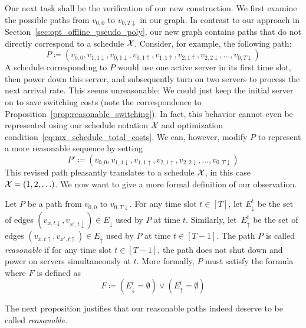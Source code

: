 Our next task shall be the verification of our new construction. We first examine the possible paths from $v_{0,0}$ to $v_{0,T\downarrow}$ in our graph.
In contrast to our approach in Section~\ref{sec:opt_offline_pseudo_poly}, our new graph contains paths that do not directly correspond to a schedule $\mathcal{X}$. Consider, for example, the following path:
\begin{equation*}
	P\coloneqq(v_{0,0},v_{1,1\downarrow},v_{0,1\downarrow},v_{0,1\uparrow},v_{1,1\uparrow},v_{2,1\uparrow},v_{2,2\downarrow},\dotsc,v_{0,T\downarrow})
\end{equation*}
A schedule corresponding to $P$ would use one active server in its first time slot, then power down this server, and subsequently turn on two servers to process the next arrival rate. This seems unreasonable: We could just keep the initial server on to save switching costs (note the correspondence to Proposition~\ref{prop:reasonable_switching}). In fact, this behavior cannot even be represented using our schedule notation $\mathcal{X}$ and optimization condition~\eqref{eq:mx_schedule_total_costs}. We can, however, modify $P$ to represent a more reasonable sequence by setting
\begin{equation*}
	P'\coloneqq(v_{0,0},v_{1,1\downarrow},v_{1,1\uparrow},v_{2,1\uparrow},v_{2,2\downarrow},\dotsc,v_{0,T\downarrow})
\end{equation*}
This revised path pleasantly translates to a schedule $\mathcal{X}$, in this case $\mathcal{X}=(1,2,\ldots)$. We now want to give a more formal definition of our observation.
\begin{defn}\label{defn_reasn_paths}
Let $P$ be a path from $v_{0,0}$ to $v_{0,T\downarrow}$. For any time slot $t\in[T]$, let $E_\downarrow^t$ be the set of edges $(v_{x,t\downarrow},v_{x',t\downarrow})\in E_\downarrow$ used by $P$ at time $t$. Similarly, let~$E_\uparrow^t$ be the set of edges $(v_{x,t\uparrow},v_{x',t\uparrow})\in E_\uparrow$ used by $P$ at time $t\in[T-1]$.
The path $P$ is called \emph{reasonable} if for any time slot $t\in[T-1]$, the path does not shut down and power on servers simultaneously at $t$. More formally, $P$ must satisfy the formula  where $F$ is defined as
\begin{equation}
	F\coloneqq\left(E_\downarrow^t=\emptyset\right)\lor\left(E_\uparrow^t=\emptyset\right)\label{eq:reasn_path}
\end{equation}
\end{defn}
The next proposition justifies that our reasonable paths indeed deserve to be called \textit{reasonable}.

